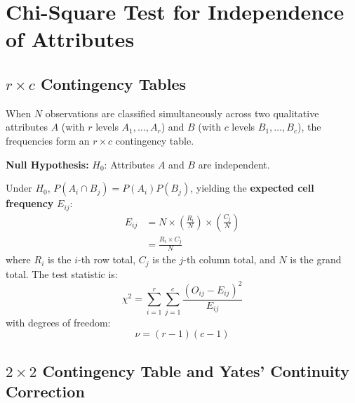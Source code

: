 \documentclass[12pt,a4paper]{article}
\begin{document}
\section{Chi-Square Test for Independence of Attributes}

\subsection{\texorpdfstring{$r \times c$}{r x c} Contingency Tables}

\begin{tcolorbox}[defbox, title={\textbf{Contingency Table and Expected Cell Frequency}}]
When $N$ observations are classified simultaneously across two qualitative attributes $A$ (with $r$ levels $A_1, \ldots, A_r$) and $B$ (with $c$ levels $B_1, \ldots, B_c$), the frequencies form an $r \times c$ contingency table.

\textbf{Null Hypothesis:} $H_0$: Attributes $A$ and $B$ are independent.

Under $H_0$, $P(A_i \cap B_j) = P(A_i)P(B_j)$, yielding the \textbf{expected cell frequency} $E_{ij}$:
\begin{equation}
  \begin{aligned}
    E_{ij} &= N \times \left(\frac{R_i}{N}\right) \times \left(\frac{C_j}{N}\right) \\[3pt]
    &= \frac{R_i \times C_j}{N}
  \end{aligned}
\end{equation}
where $R_i$ is the $i$-th row total, $C_j$ is the $j$-th column total, and $N$ is the grand total.
The test statistic is:
\begin{equation}
  \chi^2 = \sum_{i=1}^r \sum_{j=1}^c \frac{(O_{ij} - E_{ij})^2}{E_{ij}}
\end{equation}
with degrees of freedom:
\begin{equation}
  \nu = (r - 1)(c - 1)
\end{equation}
\end{tcolorbox}

\subsection{\texorpdfstring{$2 \times 2$}{2 x 2} Contingency Table and Yates' Continuity Correction}
\end{document}
